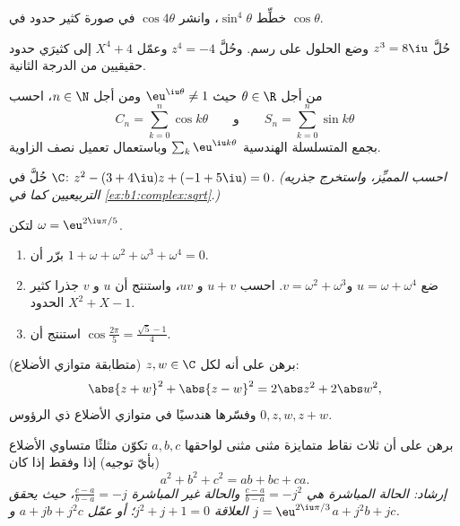 \begin{exercise}[$\star$]\label{exo:b1:complex:4}
خطِّط $\sin^4\theta$، وانشر $\cos 4\theta$ في صورة كثير حدود في
$\cos\theta$.
\end{exercise}

\begin{exercise}[$\star$]\label{exo:b1:complex:5}
حُلَّ $z^3 = 8\iu$ وضع الحلول على رسم. وحُلَّ
$z^4 = -4$ وعمّل $X^4 + 4$ إلى كثيرَي حدود حقيقيين من الدرجة الثانية.
\end{exercise}

\begin{exercise}[$\star\star$]\label{exo:b1:complex:6}
من أجل $\theta \in \R$ حيث $\eu^{\iu\theta} \neq 1$ ومن أجل $n \in \N$،
احسب
\[
C_n = \sum_{k=0}^{n} \cos k\theta
\qquad\text{و}\qquad
S_n = \sum_{k=0}^{n} \sin k\theta
\]
بجمع المتسلسلة الهندسية $\sum_k \eu^{\iu k\theta}$ وباستعمال
تعميل نصف الزاوية.
\end{exercise}

\begin{exercise}[$\star\star$]\label{exo:b1:complex:7}
حُلَّ في $\C$: $z^2 - (3 + 4\iu) z + (-1 + 5\iu) = 0$. \emph{(احسب
المميِّز، واستخرج جذريه التربيعيين كما في
\cref{ex:b1:complex:sqrt}.)}
\end{exercise}

\begin{exercise}[$\star\star$]\label{exo:b1:complex:8}
لتكن $\omega = \eu^{2\iu\pi/5}$.
\begin{enumerate}
  \item برّر أن $1 + \omega + \omega^2 + \omega^3 + \omega^4 = 0$.
  \item ضع $u = \omega + \omega^4$ و$v = \omega^2 + \omega^3$.
        احسب $u + v$ و $uv$، واستنتج أن $u$ و $v$ جذرا
        كثير الحدود $X^2 + X - 1$.
  \item استنتج أن $\cos\frac{2\pi}{5} = \frac{\sqrt 5 - 1}{4}$.
\end{enumerate}
\end{exercise}

\begin{exercise}[$\star\star$]\label{exo:b1:complex:9}
برهن على أنه لكل $z, w \in \C$ (متطابقة متوازي الأضلاع):
\[
\abs{z + w}^2 + \abs{z - w}^2 = 2\abs z^2 + 2\abs w^2 ,
\]
وفسّرها هندسيًا في متوازي الأضلاع ذي الرؤوس $0,
z, w, z + w$.
\end{exercise}

\begin{exercise}[$\star\star\star$]\label{exo:b1:complex:10}
برهن على أن ثلاث نقاط متمايزة مثنى مثنى لواحقها $a, b, c$ تكوّن
مثلثًا متساوي الأضلاع (بأيّ توجيه) إذا وفقط إذا كان
\[
a^2 + b^2 + c^2 = ab + bc + ca .
\]
\emph{إرشاد: الحالة المباشرة هي $\frac{c-a}{b-a} = -j^2$ والحالة
غير المباشرة $\frac{c-a}{b-a} = -j$، حيث يحقق $j = \eu^{2\iu\pi/3}$
العلاقة $j^2 + j + 1 = 0$؛ أو عمّل $a + jb + j^2c$ و$a + j^2 b
+ jc$.}
\end{exercise}

